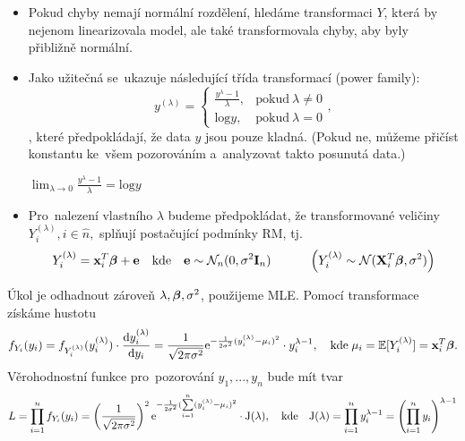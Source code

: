 \begin{itemize}
\item Pokud chyby nemají normální rozdělení, hledáme transformaci $Y$, která by nejenom linearizovala model, ale také transformovala chyby, aby byly přibližně normální.
\item Jako užitečná se~ukazuje následující třída transformací (power family):
 $$
 y^{(\lambda)} = \begin{cases}
      \frac{y^{\lambda}-1}{\lambda}, & \text{pokud}\ \lambda \neq 0 \\
      \text{log}y, & \text{pokud}\ \lambda = 0
    \end{cases},
 $$
, které předpokládají, že data $y$ jsou pouze kladná. (Pokud ne, můžeme přičíst konstantu ke~všem pozorováním a~analyzovat takto posunutá data.)
\begin{remark}
 $\lim_{\lambda \rightarrow 0}  \frac{y^{\lambda}-1}{\lambda} = \text{log}y$
\end{remark}
\item Pro~nalezení vlastního $\lambda$ budeme předpokládat, že transformované veličiny \\ $Y_i^{(\lambda)}, i\in\widehat{n},$ splňují postačující podmínky RM, tj.
 $$
 Y_i^{(\lambda)} = \mathbf{x}_i^T \boldsymbol{\beta} + \mathbf{e} \quad \text{kde} \quad \mathbf{e} \sim \mathcal{N}_n (0,\sigma^2 \textbf{I}_{n}) \quad \quad \quad \left(Y_i^{(\lambda)} \sim \mathcal{N} (\mathbf{X}_i^T \boldsymbol{\beta}, \sigma^2) \right)
 $$
\end{itemize}
Úkol je odhadnout zároveň $\lambda, \boldsymbol{\beta}, \sigma^2$, použijeme MLE. Pomocí transformace získáme hustotu
 $$
  f_{Y_i}(y_i) = f_{Y_i^{(\lambda)}}(y_i^{(\lambda)}) \cdot \frac{\mathrm{d} y_i^{(\lambda)}}{\mathrm{d} y_i} = \frac{1}{\sqrt{2 \pi \sigma^2}} \mathrm{e}^{-\frac{1}{2 \sigma^2}(y_i^{(\lambda)} - \mu_i)^2} \cdot y_i^{\lambda - 1}, \quad \text{kde} \; \mu_i = \mathbb{E}[Y_i^{(\lambda)}] = \mathbf{x}_i^T \boldsymbol{\beta}.
 $$
Věrohodnostní funkce pro~pozorování $y_1,...,y_n$ bude mít tvar
 $$
  L = \prod_{i = 1}^nf_{Y_i}(y_i) = \left(\frac{1}{\sqrt{2 \pi \sigma^2}} \right)^2 \mathrm{e}^{-\frac{1}{2 \sigma^2}(\sum\limits_{i=1}^{n} (y_i^{(\lambda)} - \mu_i)^2} \cdot \mathrm{J}(\lambda), \quad \text{kde} \quad \mathrm{J}(\lambda) = \prod_{i = 1}^n y_i^{\lambda - 1} = \left(\prod_{i = 1}^n y_i \right)^{\lambda - 1}
 $$

